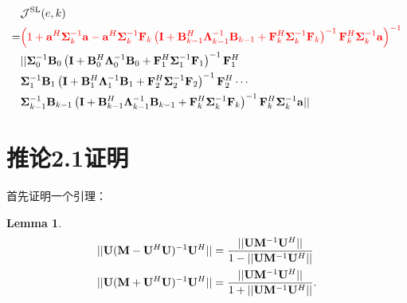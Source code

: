 \documentclass[a4paper,11pt]{article}
\newcommand\V[1]{\mathrm{\bf{#1}}}
\newcommand\Tx[1]{\mathrm{#1}}
\newcommand\Se[1]{\mathcal{#1}}
\newcommand\Nm[1]{\lvert\lvert #1\rvert\rvert}
\newcommand\SB[1]{\left(#1\right)}
\newtheorem{lemma}{Lemma}
\begin{document}
\begin{equation}
\begin{split}
&\Se{J}^{\Tx{SL}}(e,k)\\
=&\textcolor{red}{\SB{1+\V{a}^H \bm{\Sigma}_{k}^{-1}\V{a}-\V{a}^H\bm{\Sigma}_{k}^{-1} \V{F}_{k}\SB{\V{I}+\V{B}_{k-1}^H\bm{\Lambda}_{k-1}^{-1}\V{B}_{k-1}+\V{F}_{k}^H \bm{\Sigma}_{k}^{-1}\V{F}_{k}}^{-1} \V{F}_{k}^H\bm{\Sigma}_{k}^{-1} \V{a} }^{-1} }\\
&\lvert\lvert\bm{\Sigma}_{0}^{-1}\V{B}_{0}\SB{\V{I}+\V{B}_{0}^H\bm{\Lambda}_0^{-1}\V{B}_{0}+\V{F}_{1}^H\bm{\Sigma}_{1}^{-1}\V{F}_{1}}^{-1}\V{F}_{1}^H\\
&\bm{\Sigma}_{1}^{-1}\V{B}_{1}\SB{\V{I}+\V{B}_{1}^H\bm{\Lambda}_{1}^{-1}\V{B}_{1}+\V{F}_{2}^H\bm{\Sigma}_{2}^{-1}\V{F}_{2}}^{-1}\V{F}_{2}^H\cdots\\
&\bm{\Sigma}_{k-1}^{-1}\V{B}_{k-1}\SB{\V{I}+\V{B}_{k-1}^H\bm{\Lambda}_{k-1}^{-1}\V{B}_{k-1}+\V{F}_{k}^H \bm{\Sigma}_{k}^{-1}\V{F}_{k}}^{-1}\V{F}_{k}^H\bm{\Sigma}_{k}^{-1} \V{a}\rvert\rvert\\
\end{split}
\end{equation}

\section{推论2.1证明}

首先证明一个引理：
\begin{lemma}
\begin{equation}
\begin{split}
\Nm{\V{U}(\V{M}-\V{U}^H\V{U})^{-1}\V{U}^H}&=\frac{\Nm{\V{U}\V{M}^{-1}\V{U}^H}}{1-\Nm{\V{U}\V{M}^{-1}\V{U}^H}}\\
\Nm{\V{U}(\V{M}+\V{U}^H\V{U})^{-1}\V{U}^H}&=\frac{\Nm{\V{U}\V{M}^{-1}\V{U}^H}}{1+\Nm{\V{U}\V{M}^{-1}\V{U}^H}}.
\end{split}
\label{lemma1}
\end{equation}
\end{lemma}
\end{document}
